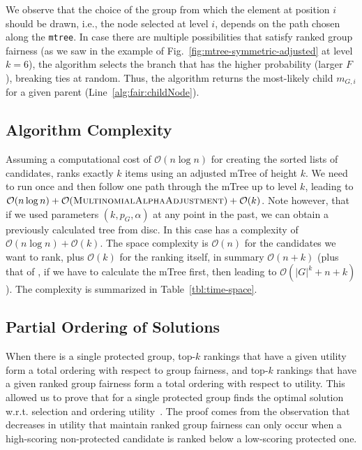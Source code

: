 We observe that the
choice of the group from which the element at position $i$ should be drawn, i.e., the node selected at level $i$, depends on the path chosen along the \texttt{mtree}. %
%
In case there are multiple possibilities that satisfy ranked group fairness (as we saw in the example of Fig.~\ref{fig:mtree-symmetric-adjusted} at level $k=6$), the algorithm selects the branch that has the higher probability (larger $F$), breaking ties at random.
%
%
Thus, the algorithm returns the most-likely child $m_{G,i}$ for a given parent (Line~\ref{alg:fair:childNode}).
%


\subsection{Algorithm Complexity}\label{subsec:FAIR-complexity}
Assuming a computational cost of $\mathcal{O}(n \log{} n)$ for creating the sorted lists of candidates, \algoFAIR ranks exactly $k$ items using an adjusted mTree of height $k$.
%
We need to run \algoMultBinary once and then follow one path through the mTree up to level $k$, leading to $\mathcal{O}(n \log{} n) + \mathcal{O} (\text{{\sc MultinomialAlphaAdjustment}}) + \mathcal{O}(k)$.
%
Note however, that if we used parameters $(k, p_G, \alpha)$ at any point in the past, we can obtain a previously calculated tree from disc.
%
In this case \algoFAIR has a complexity of $\mathcal{O}(n \log{} n) + \mathcal{O}(k)$.
%
The space complexity is $\mathcal{O}(n)$ for the candidates we want to rank, plus $\mathcal{O}(k)$ for the ranking itself, in summary $\mathcal{O}(n + k)$ (plus that of \algoMultBinary, if we have to calculate the mTree first, then leading to $\mathcal{O}(|G|^k + n + k)$).
%
The complexity is summarized in Table~\ref{tbl:time-space}.

\subsection{Partial Ordering of Solutions}
\label{sec:algo:partialOrdering}
When there is a single protected group,
top-$k$ rankings that have a given utility form a total ordering with respect to group fairness, and
top-$k$ rankings that have a given ranked group fairness form a total ordering with respect to utility.
%
This allowed us to prove that \algoFAIR for a single protected group finds the optimal solution w.r.t. selection and ordering utility~\cite{zehlike2017fair}.
%
The proof comes from the observation that decreases in utility that maintain ranked group fairness can only occur when a high-scoring non-protected candidate is ranked below a low-scoring protected one.%
%

